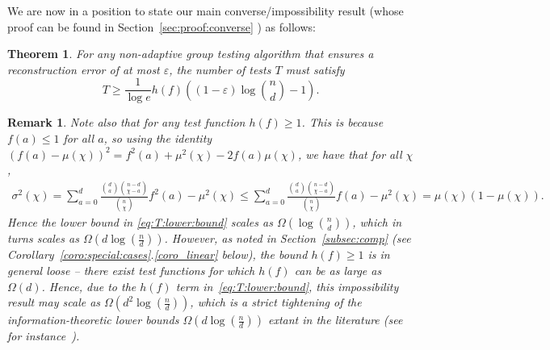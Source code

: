 \documentclass[onecolumn,letterpaper]{IEEEtran}
\newtheorem{theorem}{Theorem}
\newtheorem{remark}{Remark}
\newcommand{\na}{{a}}
\newcommand{\plsize}{{\chi}}
\newcommand{\mean}{{\mu}}
\newcommand{\var}{{\sigma^{2}}}
\newcommand{\fh}{{h(f)}}
\begin{document}




We are now in a position to state our main converse/impossibility result (whose proof can be found in Section~\ref{sec:proof:converse}
) as follows:
\begin{theorem} \label{thm:converse}
For any non-adaptive group testing algorithm that ensures a reconstruction error of at most $\varepsilon$, the number of tests $T$ must satisfy  
\begin{equation}
\label{eq:T:lower:bound}
    T \geq \frac{1}{\log e} \fh \left( (1-\varepsilon)\log\binom{n}{d} - 1 \right).
\end{equation}
\end{theorem}
\begin{remark}
\label{remark:lb}
Note also that for any test function $\fh\geq 1$. This is because $f(a)\leq 1$ for all $a$, so using the identity  $(f(\na) - \mean(\plsize))^2=f^2(\na) +\mean^2(\plsize)-2f(\na)\mean(\plsize)$, we have that for all $\plsize$,
\begin{align*}
\var(\plsize) =\sum\limits_{\na=0}^{d} \frac{\binom{d}{\na}\binom{n-d}{\plsize-\na}}{\binom{n}{\plsize}} f^2(\na)-\mean^2(\plsize)\leq \sum\limits_{\na=0}^{d} \frac{\binom{d}{\na}\binom{n-d}{\plsize-\na}}{\binom{n}{\plsize}} f(\na)-\mean^2(\plsize)=\mean(\plsize)\left(1-\mean(\plsize)\right).
\end{align*}
Hence the lower bound in \eqref{eq:T:lower:bound} scales as $ \Omega \left(\log\binom{n}{d}\right)$, which in turns scales as $ \Omega \left(d\log\left(\frac {n} {d}\right)\right)$. However, as noted in Section~\ref{subsec:comp} (see Corollary~\ref{coro:special:cases}.\ref{coro_linear} below), the bound $\fh \geq 1$ is in general loose -- there exist test functions  for which $\fh$ can be as large as $\Omega(d)$. Hence, due to the $\fh$ term in~\eqref{eq:T:lower:bound}, this impossibility result may scale as $\Omega \left(d^2\log\left(\frac {n} {d}\right)\right)$, which is a strict tightening of the information-theoretic lower bounds $\Omega \left(d\log\left(\frac {n} {d}\right)\right)$ extant in the literature (see for instance~\cite{sid2014}).
\end{remark} 
\end{document}
